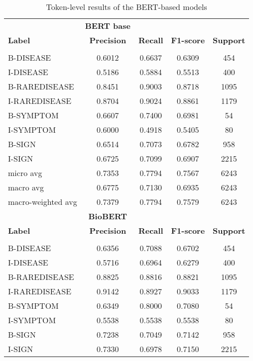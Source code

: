 \documentclass[preprint,12pt]{elsarticle}
\begin{document}
\begin{table}[H]
\centering
\tiny
\caption{\label{tab:Tokenbert}Token-level results of the BERT-based models}
\begin{tabular}{lcccc}
\\
& \multicolumn{1}{c}{\textbf{BERT base}} \\
{\bf Label} & {\bf Precision} &
{\bf Recall} &
{\bf F1-score} & {\bf Support} \\
\hline\\[-8pt]
 B-DISEASE & 0.6012 & 0.6637 & 0.6309 &   454\\
  I-DISEASE & 0.5186 & 0.5884 & 0.5513 &  400\\
B-RAREDISEASE & 0.8451 & 0.9003 & 0.8718 &  1095\\
I-RAREDISEASE & 0.8704 & 0.9024 & 0.8861 &  1179\\
  B-SYMPTOM & 0.6607 & 0.7400 & 0.6981 &    54\\
  I-SYMPTOM & 0.6000 & 0.4918 & 0.5405 &   80\\
    B-SIGN & 0.6514 & 0.7073 & 0.6782 &   958\\
       I-SIGN & 0.6725 & 0.7099 & 0.6907 &  2215\\
   

    micro avg & 0.7353 & 0.7794 & 0.7567 & 6243\\
    macro avg & 0.6775 & 0.7130 & 0.6935 & 6243\\
 macro-weighted avg & 0.7379 & 0.7794& 0.7579 & 6243\\

\hline

& \multicolumn{1}{c}{\textbf{BioBERT}} \\
{\bf Label} & {\bf Precision} &
{\bf Recall} &
{\bf F1-score} & {\bf Support} \\
\hline\\[-8pt]
B-DISEASE & 0.6356 & 0.7088 & 0.6702 &   454\\
I-DISEASE & 0.5716 & 0.6964 & 0.6279 &  400\\
    
B-RAREDISEASE & 0.8825 & 0.8816 & 0.8821 &  1095\\
I-RAREDISEASE & 0.9142 & 0.8927 & 0.9033 &  1179\\
    
B-SYMPTOM & 0.6349 & 0.8000 & 0.7080 &    54\\
I-SYMPTOM & 0.5538 & 0.5538 & 0.5538 &   80\\


   B-SIGN & 0.7238 & 0.7049 & 0.7142 &   958\\
    I-SIGN & 0.7330 & 0.6978 & 0.7150 &  2215\\
    

\end{tabular}
\end{table}
\end{document}
